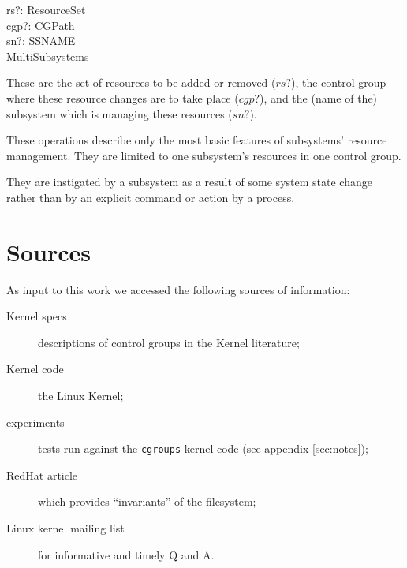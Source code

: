 \documentclass[a4paper,twoside,12pt]{article}
\begin{document}
\begin{schema*}
    rs?: ResourceSet \\
    cgp?: CGPath \\
    sn?: SSNAME \\
\also
    \Delta MultiSubsystems
\end{schema*}
These are the set of resources to be added or removed ($rs?$), the control group where these resource changes are to take place ($cgp?$), and the (name of the) subsystem which is managing these resources ($sn?$).

These operations describe only the most basic features of subsystems' resource management.
They are limited to one subsystem's resources in one control group.

They are instigated by a subsystem as a result of some system state change rather 
than by an explicit command or action by a process.



\clearpage

\appendix




\section{Sources}
\label{sec:sources}

As input to this work we accessed the following sources of information:
\begin{description}
\item[Kernel specs] descriptions of control groups in the Kernel literature\cite{linuxgroups};
\item[Kernel code] the Linux Kernel\cite{linuxkernel};
\item[experiments] tests run against the \texttt{cgroups} kernel code (see appendix \ref{sec:notes});
\item[RedHat article] which provides ``invariants'' of the filesystem\cite{rharticle};
\item[Linux kernel mailing list] for informative and timely Q and A\cite{noop}.
\end{description}
\end{document}
